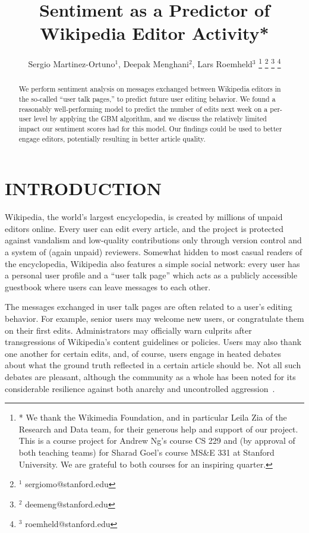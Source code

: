 \documentclass[letterpaper, 10 pt, conference]{ieeeconf}  %
\title{\LARGE \bf
Sentiment as a Predictor of Wikipedia Editor Activity*
}
\author{Sergio Martinez-Ortuno$^{1}$, Deepak Menghani$^{2}$, Lars Roemheld$^{3}$%
\thanks{* We thank the Wikimedia Foundation, and in particular Leila Zia of the Research and Data team, for their generous help and support of our project. This is a course project for Andrew Ng's course CS 229 and (by approval of both teaching teams) for Sharad Goel's course MS\&E 331 at Stanford University. We are grateful to both courses for an inspiring quarter.}%
\thanks{$^{1}$ sergiomo@stanford.edu}%
\thanks{$^{2}$ deemeng@stanford.edu}%
\thanks{$^{3}$ roemheld@stanford.edu}%
}
\begin{document}
\maketitle
\thispagestyle{empty}
\pagestyle{empty}


\begin{abstract}

We perform sentiment analysis on messages exchanged between Wikipedia editors in the so-called ``user talk pages,'' to predict future user editing behavior. We found a reasonably well-performing model to predict the number of edits next week on a per-user level by applying the GBM algorithm, and we discuss the relatively limited impact our sentiment scores had for this model. Our findings could be used to better engage editors, potentially resulting in better article quality.

\end{abstract}


\section{INTRODUCTION}

Wikipedia, the world’s largest encyclopedia, is created by millions of unpaid editors online. Every user can edit every article, and the project is protected against vandalism and low-quality contributions only through version control and a system of (again unpaid) reviewers. Somewhat hidden to most casual readers of the encyclopedia, Wikipedia also features a simple social network: every user has a personal user profile and a ``user talk page'' which acts as a publicly accessible guestbook where users can leave messages to each other. 

The messages exchanged in user talk pages are often related to a user's editing behavior. For example, senior users may welcome new users, or congratulate them on their first edits. Administrators may officially warn culprits after transgressions of Wikipedia’s content guidelines or policies. Users may also thank one another for certain edits, and, of course, users engage in heated debates about what the ground truth reflected in a certain article should be. Not all such debates are pleasant, although the community as a whole has been noted for its considerable resilience against both anarchy and uncontrolled aggression~\cite{c1, c2, c3}.
\end{document}
